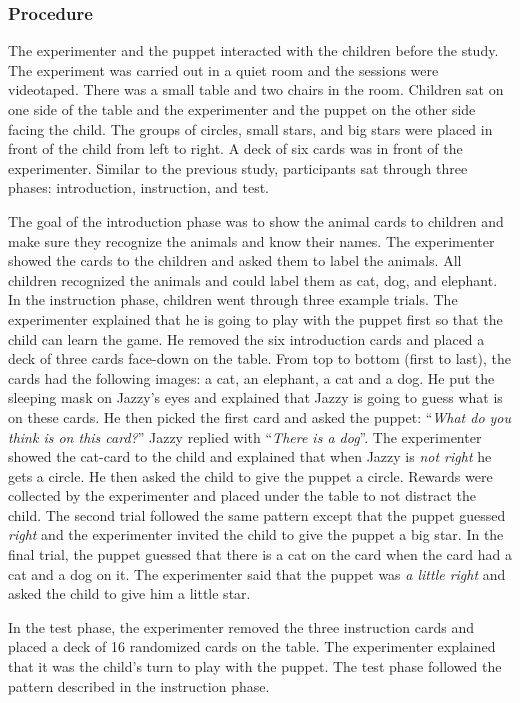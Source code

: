 \documentclass[10pt, letterpaper]{article}
\begin{document}
\subsubsection{Procedure}\label{procedure-1}

The experimenter and the puppet interacted with the children before the
study. The experiment was carried out in a quiet room and the sessions
were videotaped. There was a small table and two chairs in the room.
Children sat on one side of the table and the experimenter and the
puppet on the other side facing the child. The groups of circles, small
stars, and big stars were placed in front of the child from left to
right. A deck of six cards was in front of the experimenter. Similar to
the previous study, participants sat through three phases: introduction,
instruction, and test.

The goal of the introduction phase was to show the animal cards to
children and make sure they recognize the animals and know their names.
The experimenter showed the cards to the children and asked them to
label the animals. All children recognized the animals and could label
them as cat, dog, and elephant. In the instruction phase, children went
through three example trials. The experimenter explained that he is
going to play with the puppet first so that the child can learn the
game. He removed the six introduction cards and placed a deck of three
cards face-down on the table. From top to bottom (first to last), the
cards had the following images: a cat, an elephant, a cat and a dog. He
put the sleeping mask on Jazzy's eyes and explained that Jazzy is going
to guess what is on these cards. He then picked the first card and asked
the puppet: ``\emph{What do you think is on this card?}'' Jazzy replied
with ``\emph{There is a dog}''. The experimenter showed the cat-card to
the child and explained that when Jazzy is \emph{not right} he gets a
circle. He then asked the child to give the puppet a circle. Rewards
were collected by the experimenter and placed under the table to not
distract the child. The second trial followed the same pattern except
that the puppet guessed \emph{right} and the experimenter invited the
child to give the puppet a big star. In the final trial, the puppet
guessed that there is a cat on the card when the card had a cat and a
dog on it. The experimenter said that the puppet was \emph{a little
right} and asked the child to give him a little star.

In the test phase, the experimenter removed the three instruction cards
and placed a deck of 16 randomized cards on the table. The experimenter
explained that it was the child's turn to play with the puppet. The test
phase followed the pattern described in the instruction phase.
\end{document}
